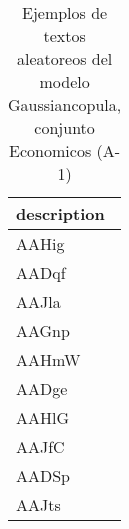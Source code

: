 \begin{table}[H]
\centering
\fontsize{8}{14}\selectfont
\caption{Ejemplos de textos aleatoreos del modelo Gaussiancopula, conjunto Economicos (A-1)}
\label{table-sample10-economicos-a-1-gaussiancopula-text}
\begin{tabular}{|m{50em}|}
\hline
\rowcolor[gray]{0.8}
description \\
\hline AAHig \\
\hline AADqf \\
\hline AAJla \\
\hline AAGnp \\
\hline AAHmW \\
\hline AADge \\
\hline AAHlG \\
\hline AAJfC \\
\hline AADSp \\
\hline AAJts \\
\hline
\end{tabular}
\end{table}
